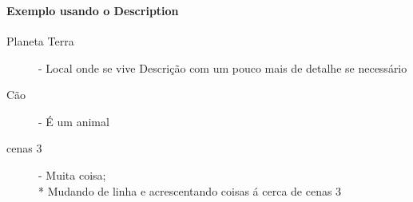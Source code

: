 \documentclass[a4paper,11pt]{report}%
\begin{document}
\paragraph{\ \ } 
\paragraph{Exemplo usando o Description} 
\begin{description}
	\item [Planeta Terra] - Local onde se vive
	\newline Descrição com um pouco mais de detalhe se necessário
	\item [Cão] - É um animal
	\item [cenas 3] - Muita coisa;
	\\* Mudando de linha e acrescentando coisas á cerca de cenas 3
\end{description}


\paragraph {\ \ }


\newpage
\end{document}
